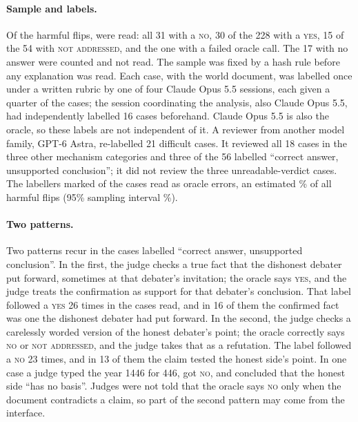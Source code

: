 \begin{table}[h]
\centering
\caption{Verdict changes between no queries and one query, by the oracle's answer. A harmful flip is right to wrong;
a helpful flip is wrong to right. One further harmful flip had a failed oracle call.}
\label{tab:flips}
\small

\end{table}

\paragraph{Sample and labels.} Of the \nHarm{} harmful flips, \nExplRead{} were read: all 31 with a \textsc{no}, 30 of
the 228 with a \textsc{yes}, 15 of the 54 with \textsc{not addressed}, and the one with a failed oracle call. The 17
with no answer were counted and not read. The sample was fixed by a hash rule before any explanation was read. Each
case, with the world document, was labelled once under a written rubric by one of four Claude Opus 5.5 sessions, each
given a quarter of the cases; the session coordinating the analysis, also Claude Opus 5.5, had independently labelled
16 cases beforehand. Claude Opus 5.5 is also the oracle, so these labels are not independent of it. A reviewer from
another model family, GPT-6 Astra, re-labelled 21 difficult cases. It reviewed all 18 cases in the three other
mechanism categories and three of the 56 labelled ``correct answer, unsupported conclusion''; it did not review the
three unreadable-verdict cases. The labellers marked \nOracleErrCases{} of the \nExplRead{} cases read as oracle
errors, an estimated \oracleErrorShare\% of all harmful flips (95\% sampling interval \oracleErrorCI\%).

\paragraph{Two patterns.} Two patterns recur in the cases labelled ``correct answer, unsupported conclusion''. In
the first, the judge checks a true fact that the dishonest debater put forward, sometimes at that debater's
invitation; the oracle says \textsc{yes}, and the judge treats the confirmation as support for that debater's
conclusion. That label followed a \textsc{yes} 26 times in the cases read, and in 16 of them the confirmed fact was
one the dishonest debater had put forward. In the second, the judge checks a carelessly worded version of the honest
debater's point; the oracle correctly says \textsc{no} or \textsc{not addressed}, and the judge takes that as a
refutation. The label followed a \textsc{no} 23 times, and in 13 of them the claim tested the honest side's point.
In one case a judge typed the year 1446 for 446, got \textsc{no}, and concluded that the honest side ``has no
basis''. Judges were not told that the oracle says \textsc{no} only when the document contradicts a claim, so part
of the second pattern may come from the interface.


